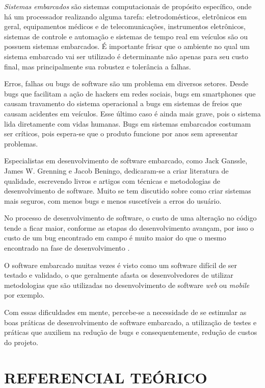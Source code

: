 \documentclass[times, twoside, watermark]{artigo}
\begin{document}
\textit{Sistemas embarcados} são sistemas computacionais de propósito específico, onde há um processador realizando alguma tarefa: eletrodomésticos, eletrônicos em geral, equipamentos médicos e de telecomunicações, instrumentos eletrônicos, sistemas de controle e automação e sistemas de tempo real em veículos são ou possuem sistemas embarcados. É importante frisar que o ambiente no qual um sistema embarcado vai ser utilizado é determinante não apenas para seu custo final, mas principalmente sua robustez e tolerância a falhas.

Erros, falhas ou bugs de software são um problema em diversos setores. Desde bugs que facilitam a ação de hackers em redes sociais, bugs em smartphones que causam travamento do sistema operacional a bugs em sistemas de freios que causam acidentes em veículos. Esse último caso é ainda mais grave, pois o sistema lida diretamente com vidas humanas. Bugs em sistemas embarcados costumam ser críticos, pois espera-se que o produto funcione por anos sem apresentar problemas.

Especialistas em desenvolvimento de software embarcado, como Jack Ganssle, James W. Grenning e Jacob Beningo, dedicaram-se a criar literatura de qualidade, escrevendo livros e artigos com técnicas e metodologias de desenvolvimento de software. Muito se tem discutido sobre como criar sistemas mais seguros, com menos bugs e menos suscetíveis a erros do usuário.

No processo de desenvolvimento de software, o custo de uma alteração no código tende a ficar maior, conforme as etapas do desenvolvimento avançam, por isso o custo de um bug encontrado em campo é muito maior do que o mesmo encontrado na fase de desenvolvimento \cite{firmware-cost}.

O software embarcado muitas vezes é visto como um software difícil de ser testado e validado, o que geralmente afasta os desenvolvedores de utilizar metodologias que são utilizadas no desenvolvimento de software \textit{web} ou \textit{mobile} por exemplo.

Com essas dificuldades em mente, percebe-se a necessidade de se estimular as boas práticas de desenvolvimento de software embarcado, a utilização de testes e práticas que auxiliem na redução de bugs e consequentemente, redução de custos do projeto.




\section*{REFERENCIAL TEÓRICO}
\end{document}
